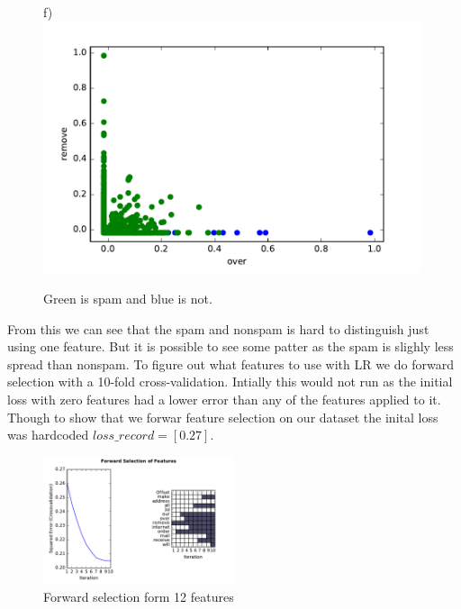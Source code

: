 \documentclass[10pt, paper=a4]{article}
\begin{document}
\begin{figure}[h]
\begin{minipage}{0.3\textwidth}
  \end{minipage} \hfill
  \begin{minipage}{0.3\textwidth}
    f)\\
    \includegraphics[width = 0.99\textwidth]{../../src/img/over_remove.pdf}
  \end{minipage} \vfill
    \caption{Green is spam and blue is not.}
  \label{fig:modelcheck}
\end{figure}

From this we can see that the spam and nonspam is hard to distinguish
just using one feature. But it is possible to see some patter as the
spam is slighly less spread than nonspam.
\newpage
To figure out what features to use with LR we do forward selection
with a 10-fold cross-validation. Intially this would not run as the
initial loss with zero features had a lower error than any of the
features applied to it. Though to show that we forwar feature
selection on our dataset the inital loss was hardcoded
$loss\_record=[0.27]$.

\begin{figure}[h]
  \centering
  \includegraphics[width = 0.5\textwidth]{../../src/img/best_forward_selection.pdf}
  \caption{Forward selection form 12 features}
  \label{fig:gam}
\end{figure}
\end{document}
